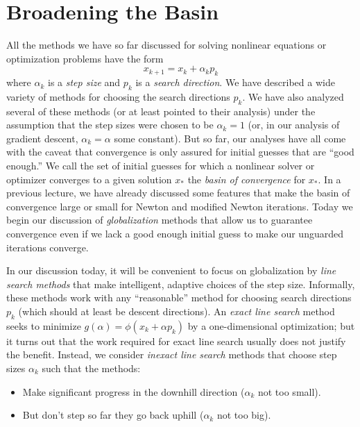 \documentclass[12pt, leqno]{article} %
\providecommand{\tightlist}{%
  \setlength{\itemsep}{0pt}\setlength{\parskip}{0pt}}
\begin{document}

\section{Broadening the Basin}

All the methods we have so far discussed for solving nonlinear equations
or optimization problems have the form \[x_{k+1} = x_k + \alpha_k p_k\]
where \(\alpha_k\) is a \emph{step size} and \(p_k\) is a \emph{search
direction}. We have described a wide variety of methods for choosing the
search directions \(p_k\). We have also analyzed several of these
methods (or at least pointed to their analysis) under the assumption
that the step sizes were chosen to be \(\alpha_k = 1\) (or, in our
analysis of gradient descent, \(\alpha_k = \alpha\) some constant). But
so far, our analyses have all come with the caveat that convergence is
only assured for initial guesses that are ``good enough.'' We call the
set of initial guesses for which a nonlinear solver or optimizer
converges to a given solution \(x_*\) the \emph{basin of convergence}
for \(x_*\). In a previous lecture, we have already discussed some
features that make the basin of convergence large or small for Newton
and modified Newton iterations. Today we begin our discussion of
\emph{globalization} methods that allow us to guarantee convergence even
if we lack a good enough initial guess to make our unguarded iterations
converge.

In our discussion today, it will be convenient to focus on globalization
by \emph{line search methods} that make intelligent, adaptive choices of
the step size. Informally, these methods work with any ``reasonable''
method for choosing search directions \(p_k\) (which should at least be
descent directions). An \emph{exact line search} method seeks to
minimize \(g(\alpha) = \phi(x_k + \alpha p_k)\) by a one-dimensional
optimization; but it turns out that the work required for exact line
search usually does not justify the benefit. Instead, we consider
\emph{inexact line search} methods that choose step sizes \(\alpha_k\)
such that the methods:

\begin{itemize}
\tightlist
\item
  Make significant progress in the downhill direction (\(\alpha_k\) not
  too small).
\item
  But don't step so far they go back uphill (\(\alpha_k\) not too big).
\end{itemize}
\end{document}
